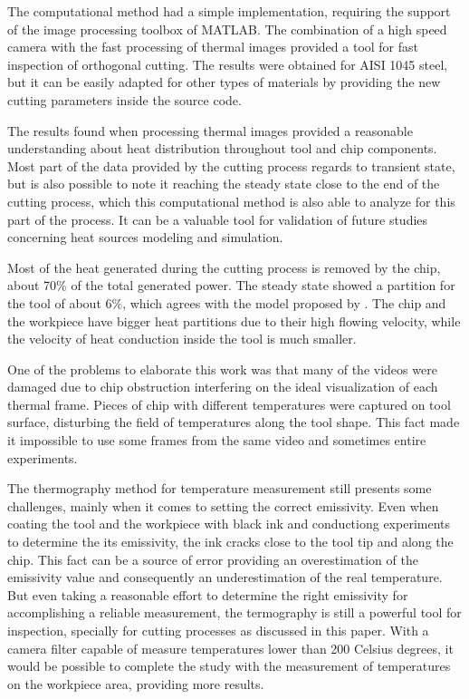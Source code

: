 The computational method had a simple implementation, requiring the support of the image processing toolbox of MATLAB. The combination of a high speed camera with the fast processing of thermal images provided a tool for fast inspection of orthogonal cutting. The results were obtained for AISI 1045 steel, but it can be easily adapted for other types of materials by providing the new cutting parameters inside the source code.

The results found when processing thermal images provided a reasonable understanding about heat distribution throughout tool and chip components. Most part of the data provided by the cutting process regards to transient state, but is also possible to note it reaching the steady state close to the end of the cutting process, which this computational method is also able to analyze for this part of the process. It can be a valuable tool for validation of future studies concerning heat sources modeling and simulation.

Most of the heat generated during the cutting process is removed by the chip, about 70\% of the total generated power. The steady state showed a partition for the tool of about 6\%, which agrees with the model proposed by . The chip and the workpiece have bigger heat partitions due to their high flowing velocity, while the velocity of heat conduction inside the tool is much smaller.

One of the problems to elaborate this work was that many of the videos were damaged due to chip obstruction interfering on the ideal visualization of each thermal frame. Pieces of chip with different temperatures were captured on tool surface, disturbing the field of temperatures along the tool shape. This fact made it impossible to use some frames from the same video and sometimes entire experiments.

The thermography method for temperature measurement still presents some challenges, mainly when it comes to setting the correct emissivity. Even when coating the tool and the workpiece with black ink and conductiong experiments to determine the its emissivity, the ink cracks close to the tool tip and along the chip. This fact can be a source of error providing an overestimation of the emissivity value and consequently an underestimation of the real temperature. But even taking a reasonable effort to determine the right emissivity for accomplishing a reliable measurement, the termography is still a powerful tool for inspection, specially for cutting processes as discussed in this paper. With a camera filter capable of measure temperatures lower than 200 Celsius degrees, it would be possible to complete the study with the measurement of temperatures on the workpiece area, providing more results.


